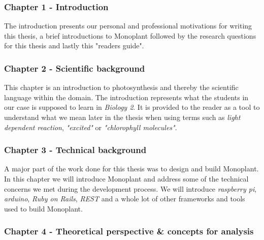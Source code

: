 \subsubsection*{Chapter 1 - Introduction}
The introduction presents our personal and professional motivations for writing this thesis, a brief introductions to Monoplant followed by the research questions for this thesis and lastly this "readers guide".

\subsubsection*{Chapter 2 - Scientific background}
This chapter is an introduction to photosynthesis and thereby the scientific language within the domain. The introduction represents what the students in our case is supposed to learn in \emph{Biology 2}. It is provided to the reader as a tool to understand what we mean later in the thesis when using terms such as \emph{light dependent reaction}, \emph{"excited"} or \emph{"chlorophyll molecules"}.

\subsubsection*{Chapter 3 - Technical background}
A major part of the work done for this thesis was to design and build Monoplant. In this chapter we will introduce Monoplant and address some of the technical concerns we met during the development process. We will introduce \emph{raspberry pi}, \emph{arduino}, \emph{Ruby on Rails}, \emph{REST} and a whole lot of other frameworks and tools used to build Monoplant.

\subsubsection*{Chapter 4 - Theoretical perspective \& concepts for analysis}

